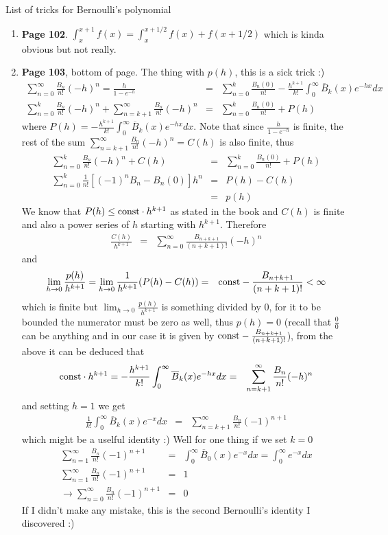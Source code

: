 \documentclass[aps,preprint,preprintnumbers,nofootinbib,showpacs,prd]{revtex4-1}
\newcommand{\nbea}{\begin{eqnarray*}}
\newcommand{\neea}{\end{eqnarray*}}
\begin{document}
List of tricks for Bernoulli's polynomial
%
\begin{enumerate}
%
\item {\bf Page 102}. $\int_x^{x + 1} f(x) = \int_x^{x+1/2} f(x) + f(x + 1/2)$ which is kinda obvious but not really.
%
\item {\bf Page 103}, bottom of page. The thing with $p(h)$, this is a sick trick :)
%
\nbea
\sum_{n=0}^\infty \frac{B_n}{n!}(-h)^n = \frac{h}{1 - e^{-h}} & = & \sum_{n = 0}^k \frac{B_n(0)}{n!} - \frac{h^{k+1}}{k!} \int_0^\infty \overline{B}_k(x) e^{-hx} dx \\
\sum_{n=0}^k \frac{B_n}{n!}(-h)^n + \sum_{n=k+1}^\infty \frac{B_n}{n!}(-h)^n & = & \sum_{n = 0}^k \frac{B_n(0)}{n!} + P(h) 
\neea
%
where $P(h) = - \frac{h^{k+1}}{k!} \int_0^\infty \overline{B}_k(x) e^{-hx} dx$. Note that since $\frac{h}{1 - e^{-h}}$ is finite, the rest of the sum $\sum_{n=k+1}^\infty \frac{B_n}{n!}(-h)^n = C(h)$ is also finite, thus
%
\nbea
\sum_{n=0}^k \frac{B_n}{n!}(-h)^n + C(h) & = & \sum_{n = 0}^k \frac{B_n(0)}{n!} + P(h)  \\
\sum_{n=0}^k \frac{1}{n!}[(-1)^nB_n - B_n(0)]h^n & = & P(h) - C(h) \\
& = & p(h)
\neea
%
We know that $P(h) \le {\rm const} \cdot h^{k+1}$ as stated in the book and $C(h)$ is finite and also a power series of $h$ starting with $h^{k+1}$. Therefore
%
\nbea
\frac{C(h)}{h^{k+1}} & = & \sum_{n = 0}^\infty \frac{B_{n+k+1}}{(n+k+1)!} (-h)^n
\neea
%
and
%
\nbea
\lim_{h\to 0} \frac{p(h)}{h^{k+1}} = \lim_{h\to 0} \frac{1}{h^{k+1}} (P(h) - C(h)) & = & {\rm const} - \frac{B_{n+k+1}}{(n+k+1)!} < \infty
\neea
%
which is finite but $\lim_{h\to0} \frac{p(h)}{h^{k+1}}$ is something divided by 0, for it to be bounded the numerator must be zero as well, thus $p(h) = 0$ (recall that $\frac{0}{0}$ can be anything and in our case it is given by ${\rm const} - \frac{B_{n+k+1}}{(n+k+1)!}$), from the above it can be deduced that
%
\nbea
{\rm const} \cdot h^{k+1} = -\frac{h^{k+1}}{k!} \int_0^\infty \overline{B}_k(x) e^{-hx} dx & = & \sum_{n = k+1}^\infty \frac{B_{n}}{n!} (-h)^n
\neea
%
and setting $h = 1$ we get
%
\nbea
\frac{1}{k!} \int_0^\infty \overline{B}_k(x) e^{-x} dx & = & \sum_{n = k+1}^\infty \frac{B_{n}}{n!} (-1)^{n+1}
\neea
%
which might be a uselful identity :) Well for one thing if we set $k=0$
%
\nbea
\sum_{n = 1}^\infty \frac{B_{n}}{n!} (-1)^{n+1} & = & \int_0^\infty \overline{B}_0 (x) e^{-x} dx = \int_0^\infty e^{-x} dx \\
\sum_{n = 1}^\infty \frac{B_{n}}{n!} (-1)^{n+1} & = & 1 \\
\to \sum_{n = 0}^\infty \frac{B_{n}}{n!} (-1)^{n+1} & = & 0
\neea
%
If I didn't make any mistake, this is the second Bernoulli's identity I discovered :)
\end{enumerate}
\end{document}
